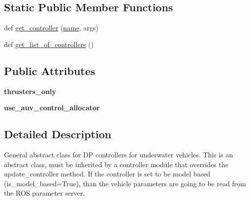 \subsection*{Static Public Member Functions}
\begin{DoxyCompactItemize}
\item 
def \hyperlink{classuuv__control__interfaces_1_1dp__controller__base_1_1DPControllerBase_aec486afa9f41a809450cf8c20d899dcc}{get\+\_\+controller} (\hyperlink{classname}{name}, args)
\item 
def \hyperlink{classuuv__control__interfaces_1_1dp__controller__base_1_1DPControllerBase_a7ce49bfa0863fb7c1f0fd2a438d53133}{get\+\_\+list\+\_\+of\+\_\+controllers} ()
\end{DoxyCompactItemize}
\subsection*{Public Attributes}
\begin{DoxyCompactItemize}
\item 
\mbox{\label{classuuv__control__interfaces_1_1dp__controller__base_1_1DPControllerBase_ab900a68aa3ff5cfeaa32f96e6684bd6f}} 
{\bfseries thrusters\+\_\+only}
\item 
\mbox{\label{classuuv__control__interfaces_1_1dp__controller__base_1_1DPControllerBase_a729d24e3222dab5e4c16a2e7b07ee34f}} 
{\bfseries use\+\_\+auv\+\_\+control\+\_\+allocator}
\end{DoxyCompactItemize}


\subsection{Detailed Description}
\begin{DoxyVerb}General abstract class for DP controllers for underwater vehicles.
This is an abstract class, must be inherited by a controller module that
overrides the update_controller method. If the controller is set to be
model based (is_model_based=True), than the vehicle parameters are going
to be read from the ROS parameter server.
\end{DoxyVerb}
 

